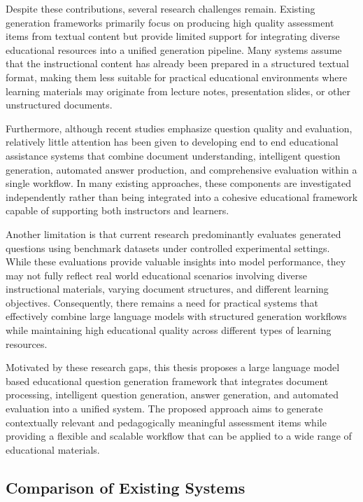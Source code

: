 Despite these contributions, several research challenges remain. Existing generation frameworks primarily focus on producing high quality assessment items from textual content but provide limited support for integrating diverse educational resources into a unified generation pipeline. Many systems assume that the instructional content has already been prepared in a structured textual format, making them less suitable for practical educational environments where learning materials may originate from lecture notes, presentation slides, or other unstructured documents.

Furthermore, although recent studies emphasize question quality and evaluation, relatively little attention has been given to developing end to end educational assistance systems that combine document understanding, intelligent question generation, automated answer production, and comprehensive evaluation within a single workflow. In many existing approaches, these components are investigated independently rather than being integrated into a cohesive educational framework capable of supporting both instructors and learners.

Another limitation is that current research predominantly evaluates generated questions using benchmark datasets under controlled experimental settings. While these evaluations provide valuable insights into model performance, they may not fully reflect real world educational scenarios involving diverse instructional materials, varying document structures, and different learning objectives. Consequently, there remains a need for practical systems that effectively combine large language models with structured generation workflows while maintaining high educational quality across different types of learning resources.

Motivated by these research gaps, this thesis proposes a large language model based educational question generation framework that integrates document processing, intelligent question generation, answer generation, and automated evaluation into a unified system. The proposed approach aims to generate contextually relevant and pedagogically meaningful assessment items while providing a flexible and scalable workflow that can be applied to a wide range of educational materials.
\subsection{Comparison of Existing Systems}
\label{sec:back-comparison}

